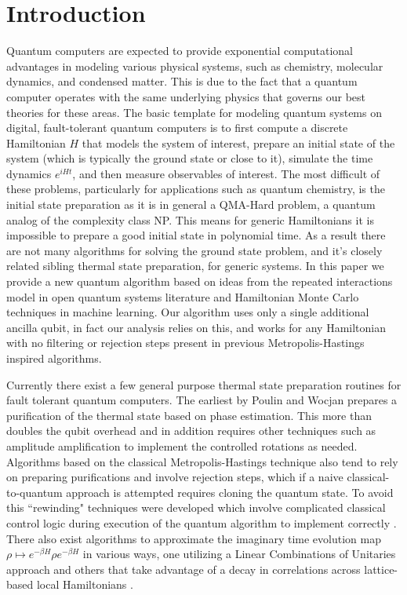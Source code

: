 \documentclass{article}
\begin{document}
\section{Introduction}
Quantum computers are expected to provide exponential computational advantages in modeling various physical systems, such as chemistry, molecular dynamics, and condensed matter. This is due to the fact that a quantum computer operates with the same underlying physics that governs our best theories for these areas. The basic template for modeling quantum systems on digital, fault-tolerant quantum computers is to first compute a discrete Hamiltonian $H$ that models the system of interest, prepare an initial state of the system (which is typically the ground state or close to it), simulate the time dynamics $e^{i H t}$, and then measure observables of interest. The most difficult of these problems, particularly for applications such as quantum chemistry, is the initial state preparation as it is in general a QMA-Hard problem, a quantum analog of the complexity class NP. This means for generic Hamiltonians it is impossible to prepare a good initial state in polynomial time. As a result there are not many algorithms for solving the ground state problem, and it's closely related sibling thermal state preparation, for generic systems. In this paper we provide a new quantum algorithm based on ideas from the repeated interactions model in open quantum systems literature and Hamiltonian Monte Carlo techniques in machine learning. Our algorithm uses only a single additional ancilla qubit, in fact our analysis relies on this, and works for any Hamiltonian with no filtering or rejection steps present in previous Metropolis-Hastings inspired algorithms. 

Currently there exist a few general purpose thermal state preparation routines for fault tolerant quantum computers. The earliest by Poulin and Wocjan \cite{poulin2009sampling} prepares a purification of the thermal state based on phase estimation. This more than doubles the qubit overhead and in addition requires other techniques such as amplitude amplification to implement the controlled rotations as needed. Algorithms based on the classical Metropolis-Hastings technique also tend to rely on preparing purifications and involve rejection steps, which if a naive classical-to-quantum approach is attempted requires cloning the quantum state. To avoid this ``rewinding" techniques were developed \cite{marriott2005quantum} which involve complicated classical control logic during execution of the quantum algorithm to implement correctly \cite{temme2011}. There also exist algorithms to approximate the imaginary time evolution map $\rho \mapsto e^{-\beta H} \rho e^{-\beta H}$ in various ways, one utilizing a Linear Combinations of Unitaries approach \cite{chowdhury2016quantumalgorithmsgibbssampling} and others that take advantage of a decay in correlations across lattice-based local Hamiltonians \cite{motta2019}. 
\end{document}
